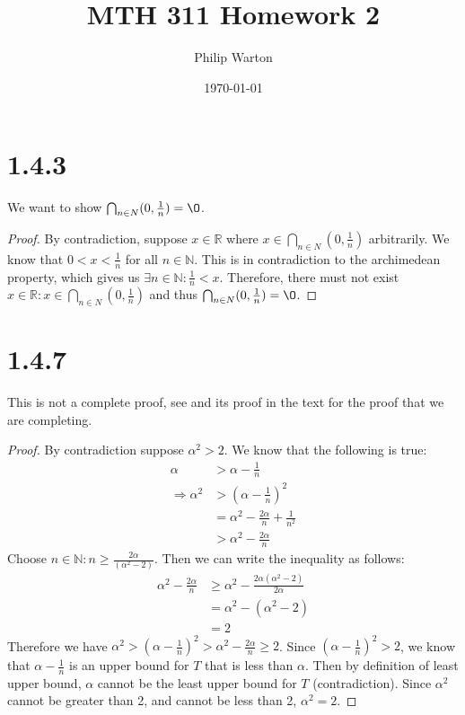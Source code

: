 \documentclass{article}
\begin{document}
\title{MTH 311 Homework 2}
\author{Philip Warton}
\date{\today}
\maketitle
\section*{1.4.3}

We want to show $\bigcap_{n \in N} (0, \frac{1}{n}) = \O$.

\begin{proof}
By contradiction, suppose $x \in \mathbb{R}$ where $x \in \bigcap_{n \in N} (0, \frac{1}{n})$ arbitrarily. We know that  $0 < x < \frac{1}{n}$ for all $n \in \mathbb{N}$. This is in contradiction to the archimedean property, which gives us $\exists n \in \mathbb{N} : \frac{1}{n} < x$. Therefore, there must not exist $x \in \mathbb{R} : x \in \bigcap_{n \in N} (0, \frac{1}{n})$ and thus $\bigcap_{n \in N} (0, \frac{1}{n}) = \O$.

\end{proof}

\section*{1.4.7}

This is not a complete proof, see  and its proof in the text for the proof that we are completing.

\begin{proof}
By contradiction suppose $\alpha ^2 > 2$. We know that the following is true:
\begin{align*}
\alpha & > \alpha - \frac{1}{n} \\
\Longrightarrow \alpha ^2  & > (\alpha - \frac{1}{n})^2 \\
& = \alpha ^2 - \frac{2\alpha}{n} + \frac{1}{n^2} \\
& > \alpha ^2 - \frac{2\alpha}{n}
\end{align*}
Choose $n \in \mathbb{N} : n \geqslant \frac{2\alpha}{(\alpha^2-2)}$. Then  we can write the inequality as follows:
\begin{align*}
\alpha^2 - \frac{2\alpha}{n} & \geqslant \alpha ^2  - \frac{2\alpha(\alpha^2-2)}{2\alpha} \\
& = \alpha^2 - (\alpha ^ 2 -2) \\
& = 2
\end{align*}
Therefore we have $\alpha^2 > (\alpha - \frac{1}{n})^2 > \alpha^2 - \frac{2\alpha}{n} \geqslant 2$. Since $(\alpha - \frac{1}{n})^2 > 2$, we know that $\alpha - \frac{1}{n}$ is an upper bound for $T$ that is less than $\alpha$. Then by definition of least upper bound, $\alpha$ cannot be the least upper bound for $T$ (contradiction). Since $\alpha^2$ cannot be greater than 2, and cannot be less than 2, $\alpha^2 = 2$.

\end{proof}
\end{document}
